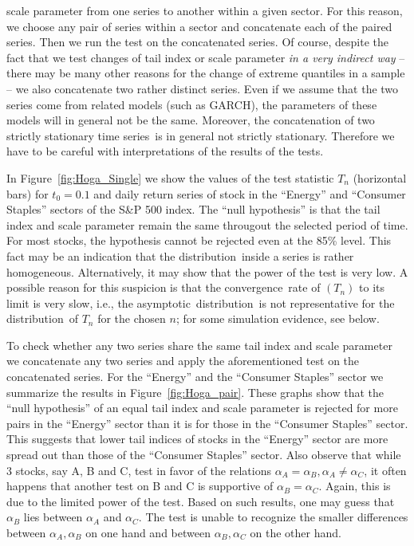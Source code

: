 \documentclass[11pt,a4]{amsart}
\newcommand{\asy}{asymptotic}
\newcommand{\ts}{time series}
\newcommand{\con}{convergence}
\newcommand{\ds}{distribution}
\newcommand{\1}{{\mathbf 1}}
\begin{document}
scale parameter from one series to another within a given sector. For this reason, we choose any pair of series
within a sector and concatenate each of the paired series. Then we run the test on the concatenated series.
Of course, despite the fact that we test changes of tail index or scale parameter 
{\em in a very indirect way} -- there may be many other reasons for the change of extreme quantiles in a sample -- 
we also concatenate two rather distinct series. Even if we assume that the two series come from related models
(such as GARCH), the parameters of these models will in general not be the same. Moreover, the concatenation
of two strictly stationary \ts\ is in general not strictly stationary. Therefore we have to be careful
with interpretations of the results of the tests.
\par 
In Figure~\ref{fig:Hoga_Single} we show the values of the test statistic $T_n$ (horizontal bars)
for $t_0=0.1$ and daily return series of stock in the ``Energy'' and ``Consumer Staples'' sectors of the S\&P
500 index. The ``null hypothesis'' is that the tail index and scale parameter remain the
same througout the selected period of time. For most stocks, the hypothesis cannot be rejected even at the 85\% level.
This fact may be an indication that the \ds\ inside a series is rather homogeneous.
Alternatively, it may show that the power of the test is very low. A possible reason for this suspicion is that the \con\ rate
of $(T_n)$ to its limit is very slow, i.e., the \asy\ \ds\ is not representative for the \ds\ of $T_n$ for the chosen $n$; for some
simulation evidence, see below.
\par
To check whether any two series share the same tail index and scale parameter we concatenate
any two series and apply the aforementioned test on the concatenated series. For the ``Energy'' and the
``Consumer Staples'' sector we summarize the results in Figure~\ref{fig:Hoga_pair}.
These graphs show that the ``null
hypothesis'' of an equal tail index and scale parameter is rejected for more pairs in the
``Energy'' sector than it is for those in the ``Consumer Staples''
sector. This suggests that lower tail indices of stocks in the
``Energy'' sector are more spread out than those of the ``Consumer
Staples'' sector. Also observe that while 3 stocks, say A, B and C, test in favor of
the relations $\alpha_A = \alpha_B, \alpha_A \neq \alpha_C$, it often
happens that another test on B and C is supportive of $\alpha_B = \alpha_C$. Again,
this is due to the limited power of the test. Based
on such results, one may guess that $\alpha_B$ lies between $\alpha_A$ and
$\alpha_C$. The test is unable to recognize the smaller differences
between $\alpha_A, \alpha_B$ on one hand and between $\alpha_B, \alpha_C$ on the other hand.
\end{document}
